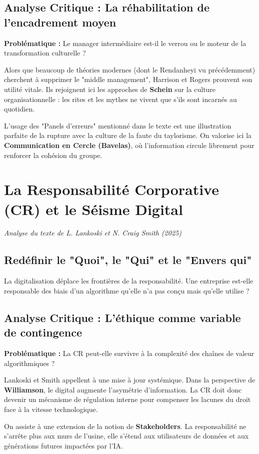 \documentclass[12pt,a4paper]{report}
\begin{document}
\subsection{Analyse Critique : La réhabilitation de l'encadrement moyen}
\textbf{Problématique :} Le manager intermédiaire est-il le verrou ou le moteur de la transformation culturelle ?

Alors que beaucoup de théories modernes (dont le Rendanheyi vu précédemment) cherchent à supprimer le "middle management", Harrison et Rogers prouvent son utilité vitale. Ils rejoignent ici les approches de \textbf{Schein} sur la culture organisationnelle : les rites et les mythes ne vivent que s'ils sont incarnés au quotidien. 

L'usage des "Panels d'erreurs" mentionné dans le texte est une illustration parfaite de la rupture avec la culture de la faute du taylorisme. On valorise ici la \textbf{Communication en Cercle (Bavelas)}, où l'information circule librement pour renforcer la cohésion du groupe.


\section{La Responsabilité Corporative (CR) et le Séisme Digital}
\textit{Analyse du texte de L. Lankoski et N. Craig Smith (2025)}

\subsection{Redéfinir le "Quoi", le "Qui" et le "Envers qui"}
La digitalisation déplace les frontières de la responsabilité. Une entreprise est-elle responsable des biais d'un algorithme qu'elle n'a pas conçu mais qu'elle utilise ?

\subsection{Analyse Critique : L'éthique comme variable de contingence}
\textbf{Problématique :} La CR peut-elle survivre à la complexité des chaînes de valeur algorithmiques ?

Lankoski et Smith appellent à une mise à jour systémique. Dans la perspective de \textbf{Williamson}, le digital augmente l'asymétrie d'information. La CR doit donc devenir un mécanisme de régulation interne pour compenser les lacunes du droit face à la vitesse technologique. 

On assiste à une extension de la notion de \textbf{Stakeholders}. La responsabilité ne s'arrête plus aux murs de l'usine, elle s'étend aux utilisateurs de données et aux générations futures impactées par l'IA.
\end{document}

